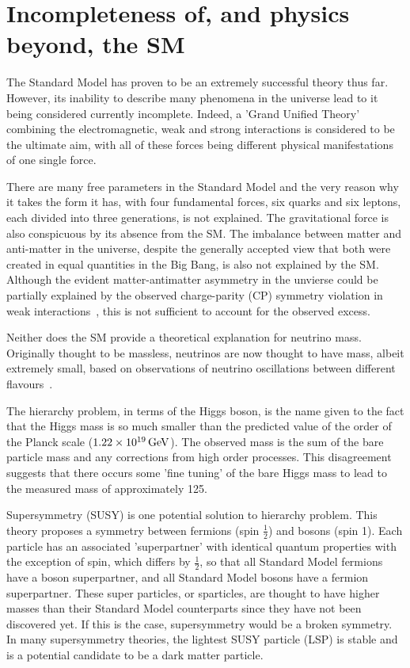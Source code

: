 \section{Incompleteness of, and physics beyond, the SM}
\label{s:Incompleteness_of_and_physics_beyond_the_SM}
The Standard Model has proven to be an extremely successful theory thus far. However, its inability to
describe many phenomena in the universe lead to it being considered currently incomplete. Indeed, a 'Grand
Unified Theory' combining the electromagnetic, weak and strong interactions is considered to be the ultimate
aim, with all of these forces being different physical manifestations of one single force.

There are many free parameters in the Standard Model and the very reason why it takes the form it has, with
four fundamental forces, six quarks and six leptons, each divided into three generations, is not explained.
The gravitational force is also conspicuous by its absence from the SM. The imbalance between matter and
anti-matter in the universe, despite the generally accepted view that both were created in equal quantities in
the Big Bang, is also not explained by the SM. Although the evident matter-antimatter asymmetry in the
unvierse could be partially explained by the observed charge-parity (CP) symmetry violation in weak
interactions~\cite{Christenson:1964fg}, this is not sufficient to account for the observed excess.

Neither does the SM provide a theoretical explanation for neutrino mass. Originally thought to be massless,
neutrinos are now thought to have mass, albeit extremely small, based on observations of neutrino oscillations
between different flavours~\cite{Kajita:1998bw,Fukuda:1998mi}.

The hierarchy problem, in terms of the Higgs boson, is the name given to the fact that the Higgs mass is so
much smaller than the predicted value of the order of the Planck scale ($1.22\times10^{19}\,\text{Ge\hspace{-.08em}V}$). The observed
mass is the sum of the bare particle mass and any corrections from high order processes. This disagreement
suggests that there occurs some 'fine tuning' of the bare Higgs mass to lead to the measured mass of
approximately 125\GeV.

Supersymmetry (SUSY) is one potential solution to hierarchy problem. This theory proposes a symmetry
between fermions (spin $\frac{1}{2}$) and bosons (spin 1). Each particle has an associated 'superpartner' with
identical quantum properties with the exception of spin, which differs by $\frac{1}{2}$, so that all
Standard Model fermions have a boson superpartner, and all Standard Model bosons have a fermion superpartner.
These super particles, or sparticles, are thought to have higher masses than their Standard Model counterparts
since they have not been discovered yet. If this is the case, supersymmetry would be a broken symmetry. In
many supersymmetry theories, the lightest SUSY particle (LSP) is stable and is a potential candidate to be
a dark matter particle.

